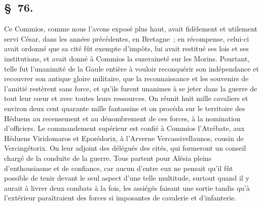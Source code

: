 \documentclass[french,twoside]{book} %
\begin{document}
\subsection[{§ 76.}]{ \textsc{§ 76.} }
\noindent Ce Commios, comme nous l’avons exposé plus haut, avait fidèlement et utilement servi César, dans les années précédentes, en Bretagne ; en récompense, celui-ci avait ordonné que sa cité fût exempte d’impôts, lui avait restitué ses lois et ses institutions, et avait donné à Commios la suzeraineté sur les Morins. Pourtant, telle fut l’unanimité de la Gaule entière à vouloir reconquérir son indépendance et recouvrer son antique gloire militaire, que la reconnaissance et les souvenirs de l’amitié restèrent sans force, et qu’ils furent unanimes à se jeter dans la guerre de tout leur cœur et avec toutes leurs ressources. On réunit huit mille cavaliers et environ deux cent quarante mille fantassins et on procéda sur le territoire des Héduens au recensement et au dénombrement de ces forces, à la nomination d’officiers. Le commandement supérieur est confié à Commios l’Atrébate, aux Héduens Viridomaros et Eporédorix, à l’Arverne Vercassivellaunos, cousin de Vercingétorix. On leur adjoint des délégués des cités, qui formeront un conseil chargé de la conduite de la guerre. Tous partent pour Alésia pleins d’enthousiasme et de confiance, car aucun d’entre eux ne pensait qu’il fût possible de tenir devant le seul aspect d’une telle multitude, surtout quand il y aurait à livrer deux combats à la fois, les assiégés faisant une sortie tandis qu’à l’extérieur paraîtraient des forces si imposantes de cavalerie et d’infanterie.
\end{document}
